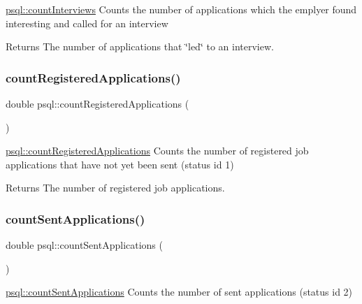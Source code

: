 \mbox{\hyperlink{classpsql_a84c1fdea2d09783a39677c4f79d924fc}{psql\+::count\+Interviews}} Counts the number of applications which the emplyer found interesting and called for an interview 

\begin{DoxyReturn}{Returns}
The number of applications that \char`\"{}led\char`\"{} to an interview. 
\end{DoxyReturn}
\mbox{\label{classpsql_a8673a80968d293cd3ead6e6e9da8dd8a}} 
\subsubsection{\texorpdfstring{countRegisteredApplications()}{countRegisteredApplications()}}
{\footnotesize\ttfamily double psql\+::count\+Registered\+Applications (\begin{DoxyParamCaption}{ }\end{DoxyParamCaption})}



\mbox{\hyperlink{classpsql_a8673a80968d293cd3ead6e6e9da8dd8a}{psql\+::count\+Registered\+Applications}} Counts the number of registered job applications that have not yet been sent (status id 1) 

\begin{DoxyReturn}{Returns}
The number of registered job applications. 
\end{DoxyReturn}
\mbox{\label{classpsql_af5e6768f6c51ac7b94571505f7a628e4}} 
\subsubsection{\texorpdfstring{countSentApplications()}{countSentApplications()}}
{\footnotesize\ttfamily double psql\+::count\+Sent\+Applications (\begin{DoxyParamCaption}{ }\end{DoxyParamCaption})}



\mbox{\hyperlink{classpsql_af5e6768f6c51ac7b94571505f7a628e4}{psql\+::count\+Sent\+Applications}} Counts the number of sent applications (status id 2) 

